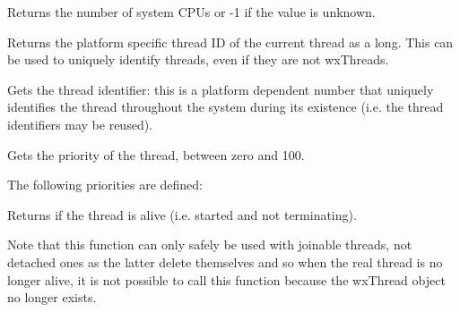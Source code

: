 \label{wxthreadgetcpucount}


Returns the number of system CPUs or -1 if the value is unknown.




\label{wxthreadgetcurrentid}


Returns the platform specific thread ID of the current thread as a
long.  This can be used to uniquely identify threads, even if they are
not wxThreads.


\label{wxthreadgetid}


Gets the thread identifier: this is a platform dependent number that uniquely identifies the
thread throughout the system during its existence (i.e. the thread identifiers may be reused).


\label{wxthreadgetpriority}


Gets the priority of the thread, between zero and 100.

The following priorities are defined:

\twocolwidtha{7cm}
\begin{twocollist}\itemsep=0pt
\end{twocollist}


\label{wxthreadisalive}


Returns \true if the thread is alive (i.e. started and not terminating).

Note that this function can only safely be used with joinable threads, not
detached ones as the latter delete themselves and so when the real thread is
no longer alive, it is not possible to call this function because
the wxThread object no longer exists.

\label{wxthreadisdetached}

